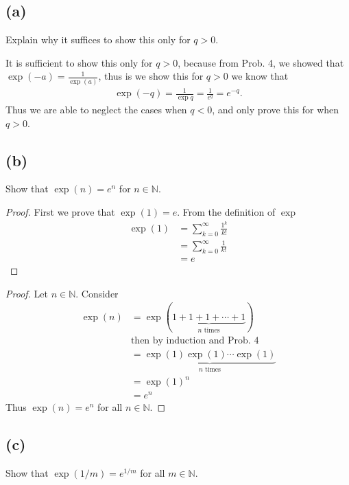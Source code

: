 \documentclass[12pt]{amsart}
\newcommand{\prob}[1]{Prob. #1}
\newcommand{\N}{\mathbb{N}}
\begin{document}
\subsection*{(a)}%
\label{sub:_a_}

Explain why it suffices to show this only for $q>0$.

It is sufficient to show this only for $q>0$, because from \prob{4}, we showed
that $\exp(-a)=\frac{1}{\exp(a)}$, thus is we show this for $q>0$ we know that
\begin{align*}
  \exp(-q)=\frac{1}{\exp{q}}=\frac{1}{e^q}=e^{-q}.
\end{align*}
Thus we are able to neglect the cases when $q<0$, and only prove this for when
$q>0$.

\subsection*{(b)}%
\label{sub:_b_}

Show that $\exp(n)=e^n$ for $n\in\N$.

\begin{proof}
  First we prove that $\exp(1)=e$. From the definition of $\exp$
  \begin{align*}
    \exp(1)&=\sum_{k=0}^\infty\frac{1^k}{k!}\\
           &=\sum_{k=0}^\infty\frac{1}{k!}\\
           &=e
  \end{align*}
\end{proof}

\begin{proof}
   Let $n\in\N$. Consider
   \begin{align*}
     \exp(n)&=\exp(\underbrace{1+1+1+\cdots+1}_\text{$n$ times})\\
            &\text{then by induction and \prob{4}}\\
            &=\underbrace{\exp(1)\exp(1)\cdots\exp(1)}_\text{$n$ times}\\
            &=\exp(1)^n\\
            &=e^n
   \end{align*}
   Thus $\exp(n)=e^n$ for all $n\in\N$.
\end{proof}

\subsection*{(c)}%
\label{sub:_c_}

Show that $\exp(1/m)=e^{1/m}$ for all $m\in\N$.
\end{document}
